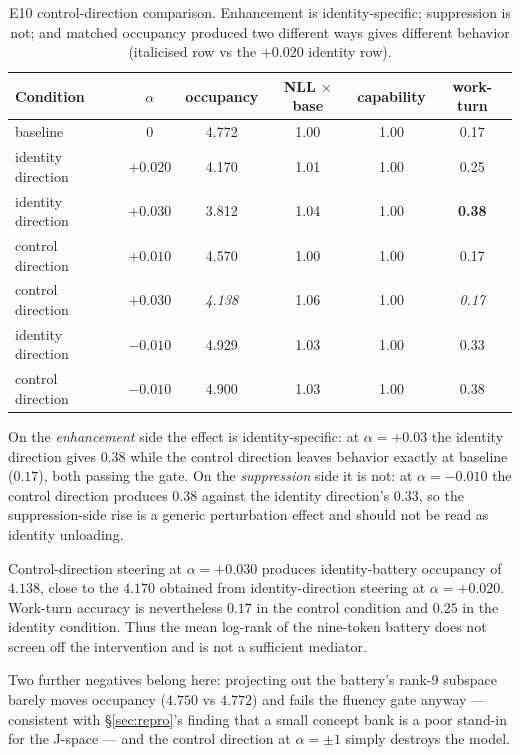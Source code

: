 \documentclass[11pt]{article}
\begin{document}
\begin{table}[h]
\centering\small
\begin{tabular}{lccccc}
\toprule
\textbf{Condition} & $\alpha$ & occupancy & NLL $\times$base & capability & work-turn \\
\midrule
baseline & 0 & 4.772 & 1.00 & 1.00 & 0.17 \\
identity direction & $+0.020$ & 4.170 & 1.01 & 1.00 & 0.25 \\
identity direction & $+0.030$ & 3.812 & 1.04 & 1.00 & \textbf{0.38} \\
control direction & $+0.010$ & 4.570 & 1.00 & 1.00 & 0.17 \\
control direction & $+0.030$ & \emph{4.138} & 1.06 & 1.00 & \emph{0.17} \\
identity direction & $-0.010$ & 4.929 & 1.03 & 1.00 & 0.33 \\
control direction & $-0.010$ & 4.900 & 1.03 & 1.00 & 0.38 \\
\bottomrule
\end{tabular}
\caption{E10 control-direction comparison. Enhancement is identity-specific; suppression is not; and matched occupancy produced two different ways gives different behavior (italicised row vs the $+0.020$ identity row).}
\label{tab:e10ctrl}
\end{table}

On the \emph{enhancement} side the effect is identity-specific: at $\alpha=+0.03$ the identity direction gives $0.38$ while the control direction leaves behavior exactly at baseline ($0.17$), both passing the gate. On the \emph{suppression} side it is not: at $\alpha=-0.010$ the control direction produces $0.38$ against the identity direction's $0.33$, so the suppression-side rise is a generic perturbation effect and should not be read as identity unloading.

Control-direction steering at $\alpha=+0.030$ produces identity-battery occupancy of $4.138$, close to the $4.170$ obtained from identity-direction steering at $\alpha=+0.020$. Work-turn accuracy is nevertheless $0.17$ in the control condition and $0.25$ in the identity condition. Thus the mean log-rank of the nine-token battery does not screen off the intervention and is not a sufficient mediator.

Two further negatives belong here: projecting out the battery's rank-9 subspace barely moves occupancy ($4.750$ vs $4.772$) and fails the fluency gate anyway --- consistent with \S\ref{sec:repro}'s finding that a small concept bank is a poor stand-in for the J-space --- and the control direction at $\alpha=\pm1$ simply destroys the model.
\end{document}
